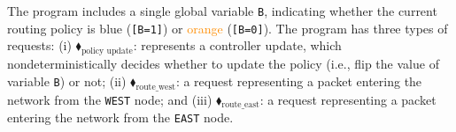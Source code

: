 %
The program includes a single global variable \texttt{B}, indicating whether the current routing policy is \textcolor{NavyBlue}{blue} (\texttt{[B=1]}) or \textcolor{darkorange}{orange} (\texttt{[B=0]}).
%
The program has three types of requests:
%	
	(i)
	{\color{ForestGreen}$\blacklozenge_\text{policy update}$}:
 represents a controller  update, which nondeterministically decides whether to update the policy (i.e., flip the value of  variable \texttt{B}) or not;
%	
(ii)
	{\color{ForestGreen}$\blacklozenge_\text{route\_west}$}:
	 a request representing a packet entering the network from the \texttt{WEST} node; and 
%	
(iii)
{\color{ForestGreen}$\blacklozenge_\text{route\_east}$}: a request representing a packet entering the network from the \texttt{EAST} node.
%


